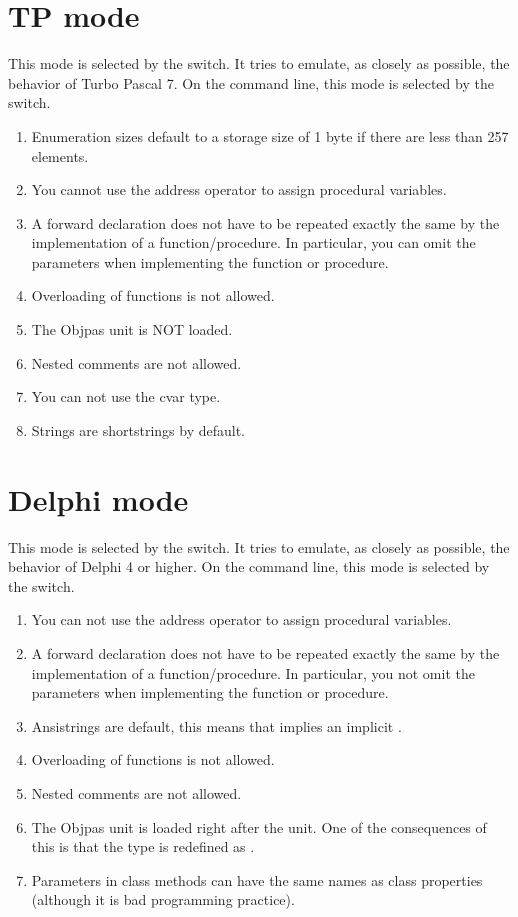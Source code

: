 \section{TP mode}
This mode is selected by the  switch. It tries to emulate, 
as closely as possible, the behavior of Turbo Pascal 7. On the command line,
this mode is selected by the  switch.

\begin{enumerate}
\item Enumeration sizes default to a storage size of 1 byte if there
are less than 257 elements.
\item You cannot use the address operator to assign procedural variables.
\item A forward declaration does not have to be repeated exactly the same by the
implementation of a function/procedure. In particular, you can omit the
parameters when implementing the function or procedure.
\item Overloading of functions is not allowed.
\item The Objpas unit is NOT loaded.
\item Nested comments are not allowed.
\item You can not use the cvar type.
\item Strings are shortstrings by default.
\end{enumerate}

\section{Delphi mode}
This mode is selected by the  switch. It tries to emulate,
as closely as possible, the behavior of Delphi 4 or higher. On the command line,
this mode is selected by the  switch.
\begin{enumerate}
\item You can not use the address operator to assign procedural variables.
\item A forward declaration does not have to be repeated exactly the same by the
implementation of a function/procedure. In particular, you not omit the
parameters when implementing the function or procedure.
\item Ansistrings are default, this means that  implies
an implicit .
\item Overloading of functions is not allowed.
\item Nested comments are not  allowed.
\item The Objpas unit is loaded right after the  unit. One of the
consequences of this is that the type  is redefined as
.
\item Parameters in class methods can have the same names as class
properties (although it is bad programming practice).
\end{enumerate}

